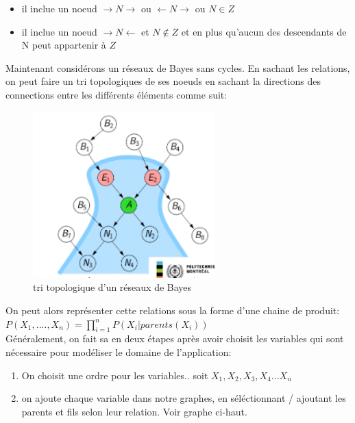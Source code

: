 \documentclass[oneside]{book}
\begin{document}
\begin{itemize}
\item il inclue un noeud $\rightarrow N \rightarrow$ ou $\leftarrow N \rightarrow$ ou $N \in Z$
\item il inclue un noeud $\rightarrow N \leftarrow$ et $N \notin Z$ et en plus qu'aucun des descendants de N peut appartenir à $Z$
\end{itemize}

Maintenant considérons un réseaux de Bayes sans cycles. En sachant les relations, on peut faire un tri topologiques de ses noeuds en sachant la directions des connections entre les différents éléments comme suit:\\

\begin{figure}[!ht]
\centering
\includegraphics[width = 7cm]{tri_topologique.png}
\caption{tri topologique d'un réseaux de Bayes}
\label{fig:topologie_bayes}
\end{figure}

On peut alors représenter cette relations sous la forme d'une chaine de produit:\\

\centering
$P(X_1,....,X_n) = \prod\limits_{i=1}^n P(X_i|parents(X_i))$\\

\justify
Généralement, on fait sa en deux étapes après avoir choisit les variables qui sont nécessaire pour modéliser le domaine de l'application:\\

\begin{enumerate}
\item On choisit une ordre pour les variables.. soit $X_1,X_2,X_3,X_4...X_n$
\item on ajoute chaque variable dans notre graphes, en séléctionnant / ajoutant les parents et fils selon leur relation. Voir graphe ci-haut.
\end{enumerate}
\end{document}
